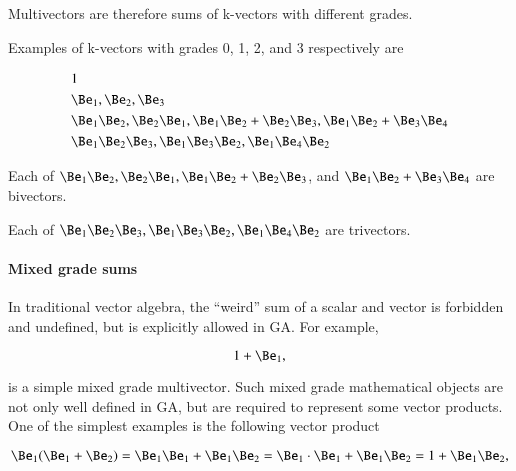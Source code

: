 Multivectors are therefore sums of k-vectors with different grades.  

Examples of k-vectors with grades 0, 1, 2, and 3 respectively are

\begin{dmath}\label{eqn:multivector:180}
\begin{aligned}
&1 \\
&\Be_1, \Be_2, \Be_3 \\
&\Be_1 \Be_2, \Be_2 \Be_1, \Be_1 \Be_2 + \Be_2 \Be_3, \Be_1 \Be_2 + \Be_3 \Be_4 \\
&\Be_1 \Be_2 \Be_3, \Be_1 \Be_3 \Be_2, \Be_1 \Be_4 \Be_2
\end{aligned}
\end{dmath}


Each of \( \Be_1 \Be_2, \Be_2 \Be_1, \Be_1 \Be_2 + \Be_2 \Be_3 \), and \( \Be_1 \Be_2 + \Be_3 \Be_4 \) are bivectors.


Each of \( \Be_1 \Be_2 \Be_3, \Be_1 \Be_3 \Be_2, \Be_1 \Be_4 \Be_2 \) are trivectors.

\paragraph{Mixed grade sums}
In traditional vector algebra, the 
``weird'' sum of a scalar and vector is forbidden and undefined, but is explicitly allowed in GA.  For example, 

\begin{dmath}\label{eqn:multivector:240}
1 + \Be_1,
\end{dmath}

is a simple mixed grade multivector.
Such mixed grade mathematical objects are not only well defined in GA, but are required to represent some vector products.  One of the simplest examples is the following vector product

\begin{dmath}\label{eqn:multivector:260}
\Be_1 ( \Be_1 + \Be_2 )
=
\Be_1 \Be_1 + \Be_1 \Be_2
=
\Be_1 \cdot \Be_1 + \Be_1 \Be_2
=
1 + \Be_1 \Be_2,
\end{dmath}

